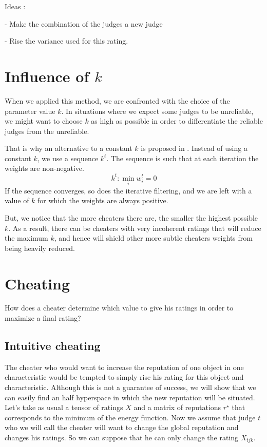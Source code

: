 \documentclass[12pt,a4paper]{article}
\begin{document}
Ideas :

- Make the combination of the judges a new judge

- Rise the variance used for this rating.
\section{Influence of $k$}
When we applied this method, we are confronted with the choice of the parameter value $k$. In situations where we expect some judges to be unreliable, we might want to choose $k$ as high as possible in order to differentiate the reliable judges from the unreliable.

That is why an alternative to a constant $k$ is proposed in \cite{Cristo1}. Instead of using a constant $k$, we use a sequence $k^t$. The sequence is such that at each iteration the weights are non-negative.
$$ k^t : \min_i w_i^t = 0$$
If the sequence converges, so does the iterative filtering, and we are left with a value of $k$ for which the weights are always positive.

But, we notice that the more cheaters there are, the smaller the highest possible $k$. As a result, there can be cheaters with very incoherent ratings that will reduce the maximum $k$, and hence will shield other more subtle cheaters weights from being heavily reduced.
\section{Cheating}
How does a cheater determine which value to give his ratings in order to maximize a final rating? 
\subsection{Intuitive cheating}

The cheater who would want to increase the reputation of one object in one characteristic would be tempted to simply rise his rating for this object and characteristic. Although this is not a guarantee of success, we will show that we can easily find an half hyperspace in which the new reputation will be situated.\\

Let's take as usual a tensor of ratings $X$ and a matrix of reputations $r^{\star}$ that corresponds to the minimum of the energy function. Now we assume that judge $t$ who we will call the cheater will want to change the global reputation and changes his ratings. So we can suppose that he can only change the rating $X_{tjk}$. 
\end{document}

